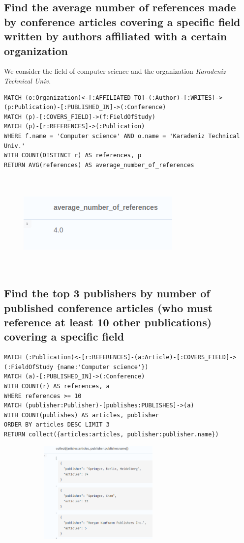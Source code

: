 \documentclass{Configuration_Files/PoliMi3i_thesis}
\begin{document}
\subsection{Find the average number of references made by conference articles covering a specific field written by authors affiliated with a certain organization}
We consider the field of computer science and the organization \textit{Karadeniz Technical Univ.}\\
\begin{lstlisting}[language=cypher, label=lst:cypher-example]
MATCH (o:Organization)<-[:AFFILIATED_TO]-(:Author)-[:WRITES]->(p:Publication)-[:PUBLISHED_IN]->(:Conference)
MATCH (p)-[:COVERS_FIELD]->(f:FieldOfStudy)
MATCH (p)-[r:REFERENCES]->(:Publication)
WHERE f.name = 'Computer science' AND o.name = 'Karadeniz Technical Univ.'
WITH COUNT(DISTINCT r) AS references, p
RETURN AVG(references) AS average_number_of_references
\end{lstlisting}
\begin{figure}[H]
    \centering
    \includegraphics[width=80mm, height=50mm]{Images/query_6.png}
        \caption{}
    \label{fig:quadtree}
\end{figure}
\subsection{Find the top 3 publishers by number of published conference articles (who must reference at least 10 other publications) covering a specific field}

\begin{lstlisting}[language=cypher, label=lst:cypher-example]
MATCH (:Publication)<-[r:REFERENCES]-(a:Article)-[:COVERS_FIELD]->(:FieldOfStudy {name:'Computer science'})
MATCH (a)-[:PUBLISHED_IN]->(:Conference)
WITH COUNT(r) AS references, a
WHERE references >= 10
MATCH (publisher:Publisher)-[publishes:PUBLISHES]->(a)
WITH COUNT(publishes) AS articles, publisher
ORDER BY articles DESC LIMIT 3
RETURN collect({articles:articles, publisher:publisher.name})
\end{lstlisting}
\begin{figure}[H]
    \centering
    \includegraphics[width=80mm, height=50mm]{Images/query_8.png}
        \caption{}
    \label{fig:quadtree}
\end{figure}
\end{document}
